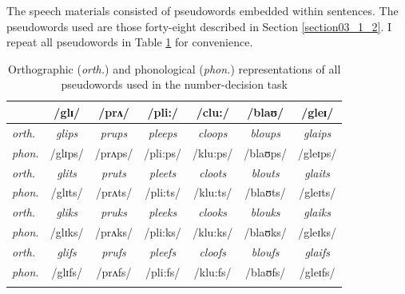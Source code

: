 The speech materials consisted of pseudowords embedded within sentences. The pseudowords used are those forty-eight described in Section \ref{section03_1_2}. I repeat all pseudowords in Table \ref{tab:8.1} for convenience.

\begin{table}\fontsize{10}{11}
\caption{Orthographic (\textit{orth.}) and phonological (\textit{phon.}) representations of all pseudowords used in the number-decision task}
\label{tab:8.1}
\centering
\begin{tabular}{lcccccc} 
\lsptoprule
~              & /glɪ/          & /prʌ/          & /pli:/          & /clu:/          & /blaʊ/          & /gleɪ/           \\ 
\midrule
\textit{orth.} & \textit{glips} & \textit{prups} & \textit{pleeps} & \textit{cloops} & \textit{bloups} & \textit{glaips}  \\
\textit{phon.} & /glɪps/        & /prʌps/        & /pli:ps/        & /klu:ps/        & /blaʊps/        & /gleɪps/         \\ 
\midrule
\textit{orth.} & \textit{glits} & \textit{pruts} & \textit{pleets} & \textit{cloots} & \textit{blouts} & \textit{glaits}  \\
\textit{phon.} & /glɪts/        & /prʌts/        & /pli:ts/        & /klu:ts/        & /blaʊts/        & /gleɪts/         \\ 
\midrule
\textit{orth.} & \textit{gliks} & \textit{pruks} & \textit{pleeks} & \textit{clooks} & \textit{blouks} & \textit{glaiks}  \\
\textit{phon.} & /glɪks/        & /prʌks/        & /pli:ks/        & /klu:ks/        & /blaʊks/        & /gleɪks/         \\ 
\midrule
\textit{orth.} & \textit{glifs} & \textit{prufs} & \textit{pleefs} & \textit{cloofs} & \textit{bloufs} & \textit{glaifs}  \\
\textit{phon.} & /glɪfs/        & /prʌfs/        & /pli:fs/        & /klu:fs/        & /blaʊfs/        & /gleɪfs/         \\
\lspbottomrule
\end{tabular}
\end{table}

